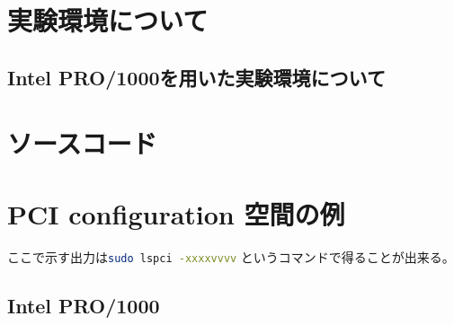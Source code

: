 \documentclass[a4paper,11pt,report]{ltjsbook}
\begin{document}
\appendix
\chapter{実験環境について}
\section{Intel PRO/1000を用いた実験環境について}
\label{letsnote}

\chapter{ソースコード}

\chapter{PCI configuration 空間の例}

ここで示す出力は\lstinline[language=sh]{sudo lspci -xxxxvvvv} というコマンドで得ることが出来る。

\section{Intel PRO/1000}
\end{document}
